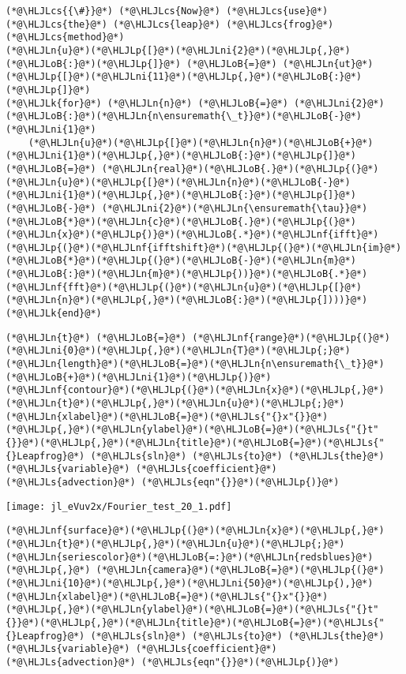 \documentclass[12pt,a4paper]{article}
\newcommand{\HLJLk}[1]{\textcolor[RGB]{148,91,176}{\textbf{#1}}}
\newcommand{\HLJLn}[1]{#1}
\newcommand{\HLJLnf}[1]{\textcolor[RGB]{66,102,213}{#1}}
\newcommand{\HLJLs}[1]{\textcolor[RGB]{201,61,57}{#1}}
\newcommand{\HLJLni}[1]{\textcolor[RGB]{59,151,46}{#1}}
\newcommand{\HLJLoB}[1]{\textcolor[RGB]{102,102,102}{\textbf{#1}}}
\newcommand{\HLJLp}[1]{#1}
\newcommand{\HLJLcs}[1]{\textcolor[RGB]{153,153,119}{\textit{#1}}}
\begin{document}
\begin{lstlisting}
(*@\HLJLcs{{\#}}@*) (*@\HLJLcs{Now}@*) (*@\HLJLcs{use}@*) (*@\HLJLcs{the}@*) (*@\HLJLcs{leap}@*) (*@\HLJLcs{frog}@*) (*@\HLJLcs{method}@*)
(*@\HLJLn{u}@*)(*@\HLJLp{[}@*)(*@\HLJLni{2}@*)(*@\HLJLp{,}@*)(*@\HLJLoB{:}@*)(*@\HLJLp{]}@*) (*@\HLJLoB{=}@*) (*@\HLJLn{ut}@*)(*@\HLJLp{[}@*)(*@\HLJLni{11}@*)(*@\HLJLp{,}@*)(*@\HLJLoB{:}@*)(*@\HLJLp{]}@*)
(*@\HLJLk{for}@*) (*@\HLJLn{n}@*) (*@\HLJLoB{=}@*) (*@\HLJLni{2}@*)(*@\HLJLoB{:}@*)(*@\HLJLn{n\ensuremath{\_t}}@*)(*@\HLJLoB{-}@*)(*@\HLJLni{1}@*)
    (*@\HLJLn{u}@*)(*@\HLJLp{[}@*)(*@\HLJLn{n}@*)(*@\HLJLoB{+}@*)(*@\HLJLni{1}@*)(*@\HLJLp{,}@*)(*@\HLJLoB{:}@*)(*@\HLJLp{]}@*) (*@\HLJLoB{=}@*) (*@\HLJLn{real}@*)(*@\HLJLoB{.}@*)(*@\HLJLp{(}@*)(*@\HLJLn{u}@*)(*@\HLJLp{[}@*)(*@\HLJLn{n}@*)(*@\HLJLoB{-}@*)(*@\HLJLni{1}@*)(*@\HLJLp{,}@*)(*@\HLJLoB{:}@*)(*@\HLJLp{]}@*) (*@\HLJLoB{-}@*) (*@\HLJLni{2}@*)(*@\HLJLn{\ensuremath{\tau}}@*)(*@\HLJLoB{*}@*)(*@\HLJLn{c}@*)(*@\HLJLoB{.}@*)(*@\HLJLp{(}@*)(*@\HLJLn{x}@*)(*@\HLJLp{)}@*)(*@\HLJLoB{.*}@*)(*@\HLJLnf{ifft}@*)(*@\HLJLp{(}@*)(*@\HLJLnf{ifftshift}@*)(*@\HLJLp{(}@*)(*@\HLJLn{im}@*)(*@\HLJLoB{*}@*)(*@\HLJLp{(}@*)(*@\HLJLoB{-}@*)(*@\HLJLn{m}@*)(*@\HLJLoB{:}@*)(*@\HLJLn{m}@*)(*@\HLJLp{))}@*)(*@\HLJLoB{.*}@*)(*@\HLJLnf{fft}@*)(*@\HLJLp{(}@*)(*@\HLJLn{u}@*)(*@\HLJLp{[}@*)(*@\HLJLn{n}@*)(*@\HLJLp{,}@*)(*@\HLJLoB{:}@*)(*@\HLJLp{])))}@*)
(*@\HLJLk{end}@*)
\end{lstlisting}


\begin{lstlisting}
(*@\HLJLn{t}@*) (*@\HLJLoB{=}@*) (*@\HLJLnf{range}@*)(*@\HLJLp{(}@*)(*@\HLJLni{0}@*)(*@\HLJLp{,}@*)(*@\HLJLn{T}@*)(*@\HLJLp{;}@*)(*@\HLJLn{length}@*)(*@\HLJLoB{=}@*)(*@\HLJLn{n\ensuremath{\_t}}@*)(*@\HLJLoB{+}@*)(*@\HLJLni{1}@*)(*@\HLJLp{)}@*)
(*@\HLJLnf{contour}@*)(*@\HLJLp{(}@*)(*@\HLJLn{x}@*)(*@\HLJLp{,}@*)(*@\HLJLn{t}@*)(*@\HLJLp{,}@*)(*@\HLJLn{u}@*)(*@\HLJLp{;}@*)(*@\HLJLn{xlabel}@*)(*@\HLJLoB{=}@*)(*@\HLJLs{"{}x"{}}@*)(*@\HLJLp{,}@*)(*@\HLJLn{ylabel}@*)(*@\HLJLoB{=}@*)(*@\HLJLs{"{}t"{}}@*)(*@\HLJLp{,}@*)(*@\HLJLn{title}@*)(*@\HLJLoB{=}@*)(*@\HLJLs{"{}Leapfrog}@*) (*@\HLJLs{sln}@*) (*@\HLJLs{to}@*) (*@\HLJLs{the}@*) (*@\HLJLs{variable}@*) (*@\HLJLs{coefficient}@*) (*@\HLJLs{advection}@*) (*@\HLJLs{eqn"{}}@*)(*@\HLJLp{)}@*)
\end{lstlisting}

\texttt{[image: jl\_eVuv2x/Fourier\_test\_20\_1.pdf]}

\begin{lstlisting}
(*@\HLJLnf{surface}@*)(*@\HLJLp{(}@*)(*@\HLJLn{x}@*)(*@\HLJLp{,}@*)(*@\HLJLn{t}@*)(*@\HLJLp{,}@*)(*@\HLJLn{u}@*)(*@\HLJLp{;}@*)(*@\HLJLn{seriescolor}@*)(*@\HLJLoB{=:}@*)(*@\HLJLn{redsblues}@*)(*@\HLJLp{,}@*) (*@\HLJLn{camera}@*)(*@\HLJLoB{=}@*)(*@\HLJLp{(}@*)(*@\HLJLni{10}@*)(*@\HLJLp{,}@*)(*@\HLJLni{50}@*)(*@\HLJLp{),}@*)
(*@\HLJLn{xlabel}@*)(*@\HLJLoB{=}@*)(*@\HLJLs{"{}x"{}}@*)(*@\HLJLp{,}@*)(*@\HLJLn{ylabel}@*)(*@\HLJLoB{=}@*)(*@\HLJLs{"{}t"{}}@*)(*@\HLJLp{,}@*)(*@\HLJLn{title}@*)(*@\HLJLoB{=}@*)(*@\HLJLs{"{}Leapfrog}@*) (*@\HLJLs{sln}@*) (*@\HLJLs{to}@*) (*@\HLJLs{the}@*) (*@\HLJLs{variable}@*) (*@\HLJLs{coefficient}@*) (*@\HLJLs{advection}@*) (*@\HLJLs{eqn"{}}@*)(*@\HLJLp{)}@*)
\end{lstlisting}
\end{document}
